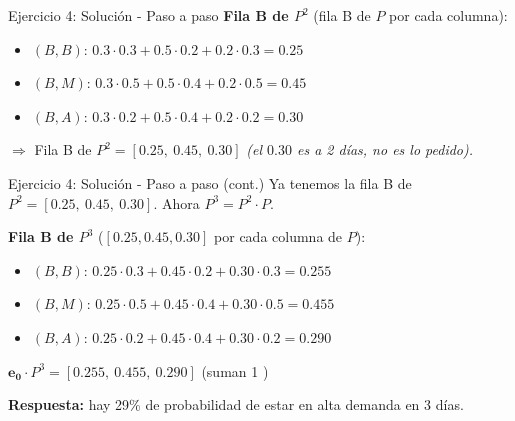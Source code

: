 \documentclass{beamer}
\begin{document}
\begin{frame}{Ejercicio 4: Solución - Paso a paso}
    \small
    \textbf{Fila B de $P^2$} (fila B de $P$ por cada columna):
    \begin{itemize}
        \item $(B,B)$: $0.3 \cdot 0.3 + 0.5 \cdot 0.2 + 0.2 \cdot 0.3 = 0.25$
        \item $(B,M)$: $0.3 \cdot 0.5 + 0.5 \cdot 0.4 + 0.2 \cdot 0.5 = 0.45$
        \item $(B,A)$: $0.3 \cdot 0.2 + 0.5 \cdot 0.4 + 0.2 \cdot 0.2 = 0.30$
    \end{itemize}
    $\Rightarrow$ Fila B de $P^2 = [0.25,\ 0.45,\ 0.30]$ \emph{(el $0.30$ es a 2 días, no es lo pedido).}
\end{frame}

\begin{frame}{Ejercicio 4: Solución - Paso a paso (cont.)}
    \small
    Ya tenemos la fila B de $P^2 = [0.25,\ 0.45,\ 0.30]$. Ahora $P^3 = P^2 \cdot P$.

    \vspace{0.4em}

    \textbf{Fila B de $P^3$} ($[0.25, 0.45, 0.30]$ por cada columna de $P$):
    \begin{itemize}
        \item $(B,B)$: $0.25 \cdot 0.3 + 0.45 \cdot 0.2 + 0.30 \cdot 0.3 = 0.255$
        \item $(B,M)$: $0.25 \cdot 0.5 + 0.45 \cdot 0.4 + 0.30 \cdot 0.5 = 0.455$
        \item $(B,A)$: $0.25 \cdot 0.2 + 0.45 \cdot 0.4 + 0.30 \cdot 0.2 = 0.290$
    \end{itemize}

    \vspace{0.4em}

    $\mathbf{e_0}\cdot P^3 = [0.255,\ 0.455,\ \boxed{0.290}]$ \quad (suman 1 \checkmark)

    \textbf{Respuesta:} hay 29\% de probabilidad de estar en alta demanda en 3 días.
\end{frame}
\end{document}
